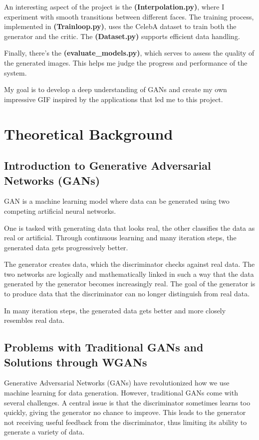 \documentclass[a4paper, 12pt]{article}
\begin{document}
An interesting aspect of the project is the \textbf{(Interpolation.py)}, where I experiment with smooth transitions between different faces. The training process, implemented in \textbf{(Trainloop.py)}, uses the CelebA dataset to train both the generator and the critic. The \textbf{(Dataset.py)} supports efficient data handling.

Finally, there's the \textbf{(evaluate\_models.py)}, which serves to assess the quality of the generated images. This helps me judge the progress and performance of the system.

My goal is to develop a deep understanding of GANs and create my own impressive GIF inspired by the applications that led me to this project.

\section{Theoretical Background}
\subsection{Introduction to Generative Adversarial Networks (GANs)}
GAN is a machine learning model where data can be generated using two competing artificial neural networks.\cite{youtube_gans}

One is tasked with generating data that looks real, the other classifies the data as real or artificial. Through continuous learning and many iteration steps, the generated data gets progressively better.\cite{youtube_gans}

The generator creates data, which the discriminator checks against real data. The two networks are logically and mathematically linked in such a way that the data generated by the generator becomes increasingly real. The goal of the generator is to produce data that the discriminator can no longer distinguish from real data.\cite{youtube_gans}

In many iteration steps, the generated data gets better and more closely resembles real data.

\subsection{Problems with Traditional GANs and Solutions through WGANs}
Generative Adversarial Networks (GANs) have revolutionized how we use machine learning for data generation. However, traditional GANs come with several challenges. A central issue is that the discriminator sometimes learns too quickly, giving the generator no chance to improve. This leads to the generator not receiving useful feedback from the discriminator, thus limiting its ability to generate a variety of data.\cite{mathworks_gan_training}
\end{document}
